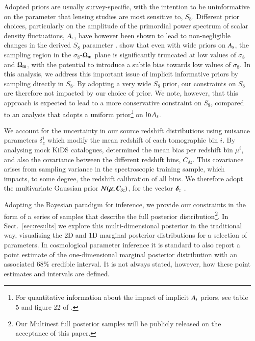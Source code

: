 Adopted priors are usually survey-specific, with the intention to be uninformative on the parameter that lensing studies are most sensitive to, $S_8$.  
Different prior choices, particularly on the amplitude of the primordial power spectrum of scalar density fluctuations, $A_{\rm s}$, have however been shown to lead to non-negligible changes in the derived $S_8$ parameter \citep{chang/etal:2019, joudaki/etal:2020, asgari/etal:2020_KD}. 
\citet{joachimi/etal:inprep} show that even with wide priors on $A_{\rm s}$,  the sampling region in the $\sigma_8$-$\Omega_{\rm m}$ plane is significantly truncated at low values of $\sigma_8$ and $\Omega_{\rm m}$, with the potential to introduce a subtle bias towards low values of $\sigma_8$.   In this analysis, we address this important issue of implicit informative priors by sampling directly in $S_8$.   By adopting a very wide $S_8$ prior, our constraints on $S_8$ are therefore not impacted by our choice of prior.  We note, however, that this approach is expected to lead to a more conservative constraint on $S_8$, compared to an analysis that adopts a uniform prior\footnote{For quantitative information about the impact of implicit $A_{\rm s}$ priors, see table 5 and figure 22 of \citet{joachimi/etal:inprep}.} on $\ln A_{\rm s}$.

We account for the uncertainty in our source redshift distributions using nuisance parameters $\delta_z^i$ which modify the mean redshift of each tomographic bin $i$.   By analysing mock KiDS catalogues, \citet{wright/etal:2020} determined the mean bias per redshift bin $\mu^i$, and also the covariance between the different redshift bins, $C_{\delta z}$.   This covariance arises from sampling variance in the spectroscopic training sample, which impacts, to some degree, the redshift calibration of all bins.    We therefore adopt the multivariate Gaussian prior ${\cal N}(\mbox{\boldmath $\mu$};\mbox{\boldmath $C$}_{\delta z})$, for the vector $\mbox{\boldmath $\delta$}_z$ \citep[see section 3 of,][for details]{hildebrandt/etal:inprep}. 

Adopting the Bayesian paradigm for inference, we provide our constraints in the form of a series of samples that describe the full posterior 
distribution\footnote{Our {\sc Multinest} full posterior samples will be publicly released on the acceptance of this paper.}.  
In Sect.~\ref{sec:results} we explore this multi-dimensional posterior in the traditional way, visualising the 2D and 1D marginal posterior distributions for a selection of parameters.  
In cosmological parameter inference it is standard to also report a point estimate of the one-dimensional marginal posterior distribution with an associated 68\% credible interval.   It
is not always stated, however, how these point estimates and intervals are defined.   

